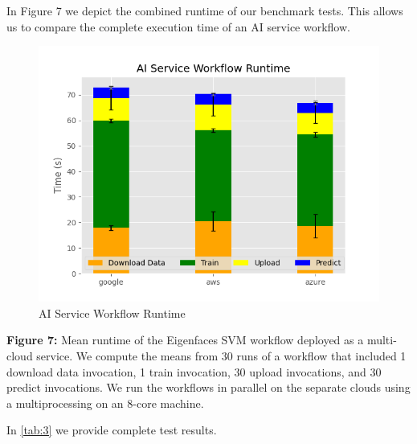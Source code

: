 In Figure 7 we depict the combined runtime of our benchmark tests. This
allows us to compare the complete execution time of an AI service
workflow.

\begin{figure}
\centering
\includegraphics{../images/ai_service_workflow_runtime.png}
\caption{AI Service Workflow Runtime}
\end{figure}

\textbf{Figure 7:} Mean runtime of the Eigenfaces SVM workflow deployed
as a multi-cloud service. We compute the means from 30 runs of a
workflow that included 1 download data invocation, 1 train invocation,
30 upload invocations, and 30 predict invocations. We run the workflows
in parallel on the separate clouds using a multiprocessing on an 8-core
machine.

In \ref{tab:3} we provide complete test results.


